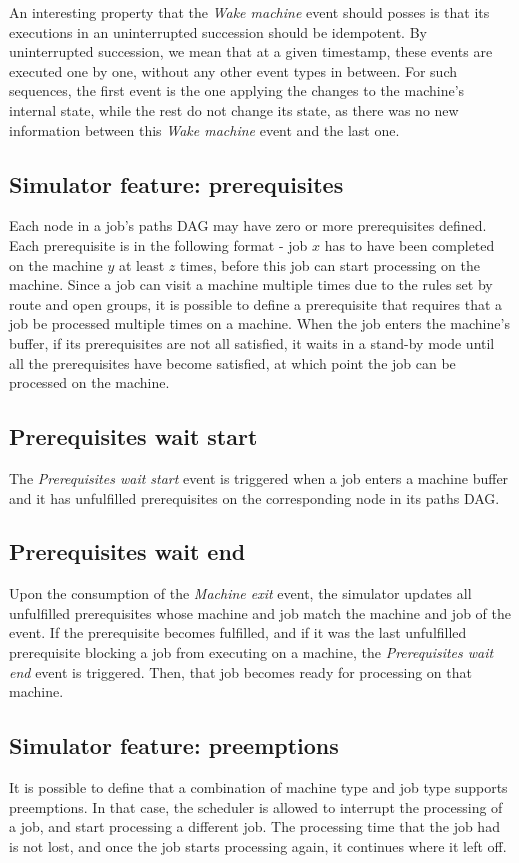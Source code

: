 An interesting property that the \textit{Wake machine} event should posses is that its executions in an uninterrupted succession should be idempotent. By uninterrupted succession, we mean that at a given timestamp, these events are executed one by one, without any other event types in between. For such sequences, the first event is the one applying the changes to the machine's internal state, while the rest do not change its state, as there was no new information between this \textit{Wake machine} event and the last one.

\subsection{Simulator feature: prerequisites}
Each node in a job's paths DAG may have zero or more prerequisites defined. Each prerequisite is in the following format - job $x$ has to have been completed on the machine $y$ at least $z$ times, before this job can start processing on the machine. Since a job can visit a machine multiple times due to the rules set by route and open groups, it is possible to define a prerequisite that requires that a job be processed multiple times on a machine. When the job enters the machine's buffer, if its prerequisites are not all satisfied, it waits in a stand-by mode until all the prerequisites have become satisfied, at which point the job can be processed on the machine.

\subsection{Prerequisites wait start}
The \textit{Prerequisites wait start} event is triggered when a job enters a machine buffer and it has unfulfilled prerequisites on the corresponding node in its paths DAG.

\subsection{Prerequisites wait end}
Upon the consumption of the \textit{Machine exit} event, the simulator updates all unfulfilled prerequisites whose machine and job match the machine and job of the event. If the prerequisite becomes fulfilled, and if it was the last unfulfilled prerequisite blocking a job from executing on a machine, the \textit{Prerequisites wait end} event is triggered. Then, that job becomes ready for processing on that machine.

\subsection{Simulator feature: preemptions}
It is possible to define that a combination of machine type and job type supports preemptions. In that case, the scheduler is allowed to interrupt the processing of a job, and start processing a different job. The processing time that the job had is not lost, and once the job starts processing again, it continues where it left off.

